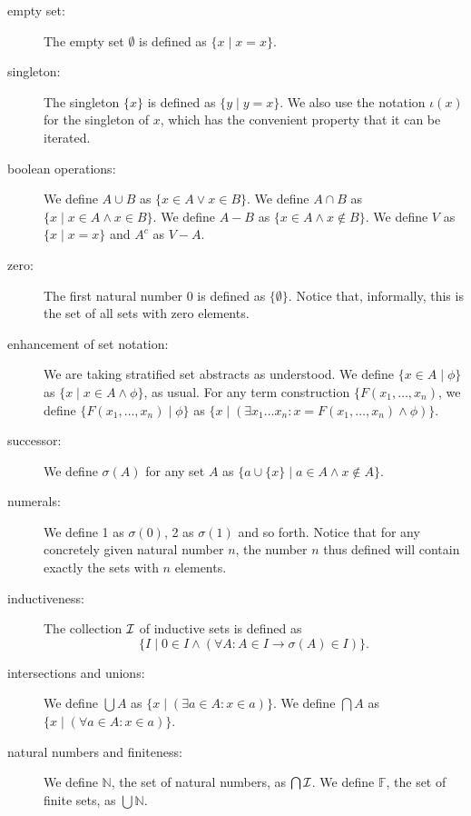 \documentclass[12pt]{article}
\begin{document}
\begin{description}

\item[empty set:]  The empty set $\emptyset$ is defined as $\{x\mid x=x\}$.

\item[singleton:]   The singleton $\{x\}$ is defined as $\{y\mid y=x\}$.  We also use the notation $\iota(x)$ for the singleton of $x$, which has the convenient property that it can be iterated.

\item[boolean operations:]  We define $A \cup B$ as $\{x \in A \vee x \in B\}$.  We define $A \cap B$ as $\{x \mid x\in A \wedge x \in B\}$.  We define $A - B$ as $\{x \in A \wedge x \not\in B\}$.  We define $V$ as
$\{x\mid x=x\}$ and $A^c$ as $V-A$.

\item[zero:]  The first natural number 0 is defined as $\{\emptyset\}$.  Notice that, informally, this is the set of all sets with zero elements.

\item[enhancement of set notation:]  We are taking stratified set abstracts as understood.  We define $\{x \in A \mid \phi\}$ as $\{x\mid x \in A \wedge \phi\}$, as usual.  For any term construction $\{F(x_1,\ldots,x_n)$, we define
$\{F(x_1,\ldots,x_n)\mid\phi\}$ as $\{x\mid (\exists x_1\ldots x_n:x=F(x_1,\ldots,x_n) \wedge \phi)\}$.

\item[successor:]  We define $\sigma(A)$ for any set $A$ as $\{a \cup \{x\}\mid a \in A \wedge x \not\in A\}$.

\item[numerals:]  We define 1 as $\sigma(0)$, 2 as $\sigma(1)$ and so forth.  Notice that for any concretely given natural number $n$, the number $n$ thus defined will contain exactly the sets with $n$ elements.

\item[inductiveness:]  The collection $\cal I$ of inductive sets is defined as $$\{I\mid 0 \in I \wedge (\forall A:A \in I \rightarrow \sigma(A) \in I)\}.$$

\item[intersections and unions:]  We define $\bigcup A$ as $\{x\mid (\exists a \in A:x \in a)\}$.   We define $\bigcap A$ as $\{x\mid (\forall a\in A:x \in a)\}$.

\item[natural numbers and finiteness:]  We define $\mathbb N$, the set of natural numbers, as $\bigcap \cal I$.  We define $\mathbb F$, the set of finite sets, as $\bigcup \mathbb N$.


\end{description}
\end{document}
